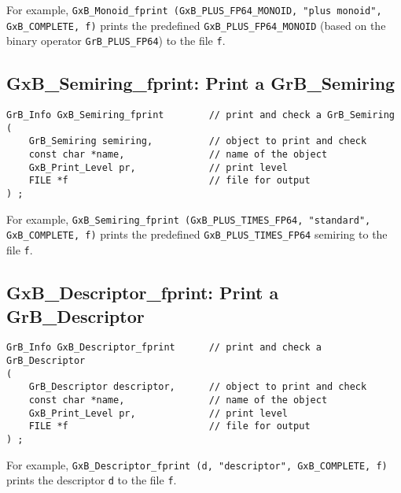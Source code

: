 \documentclass[12pt]{article}
\begin{document}
For example,
\verb'GxB_Monoid_fprint (GxB_PLUS_FP64_MONOID, "plus monoid",'
\verb'GxB_COMPLETE, f)'
prints the predefined \verb'GxB_PLUS_FP64_MONOID' (based on the binary
operator \verb'GrB_PLUS_FP64') to the file \verb'f'.

\subsection{{\sf GxB\_Semiring\_fprint:} Print a {\sf GrB\_Semiring}}

\begin{mdframed}[userdefinedwidth=6in]
{\footnotesize
\begin{verbatim}
GrB_Info GxB_Semiring_fprint        // print and check a GrB_Semiring
(
    GrB_Semiring semiring,          // object to print and check
    const char *name,               // name of the object
    GxB_Print_Level pr,             // print level
    FILE *f                         // file for output
) ;
\end{verbatim} } \end{mdframed}

For example,
\verb'GxB_Semiring_fprint (GxB_PLUS_TIMES_FP64, "standard",'
\verb'GxB_COMPLETE, f)'
prints the predefined \verb'GxB_PLUS_TIMES_FP64' semiring to the file \verb'f'.

\subsection{{\sf GxB\_Descriptor\_fprint:} Print a {\sf GrB\_Descriptor}}

\begin{mdframed}[userdefinedwidth=6in]
{\footnotesize
\begin{verbatim}
GrB_Info GxB_Descriptor_fprint      // print and check a GrB_Descriptor
(
    GrB_Descriptor descriptor,      // object to print and check
    const char *name,               // name of the object
    GxB_Print_Level pr,             // print level
    FILE *f                         // file for output
) ;
\end{verbatim} } \end{mdframed}

For example,
\verb'GxB_Descriptor_fprint (d, "descriptor", GxB_COMPLETE, f)'
prints the descriptor \verb'd' to the file \verb'f'.
\end{document}
